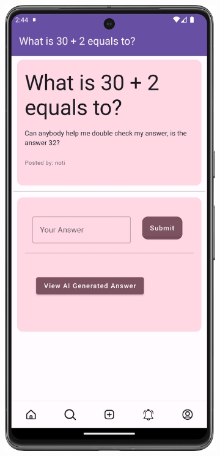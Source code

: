 \begin{figure}[H]
  \begin{subfigure}[b]{0.5\textwidth}
    \includegraphics[width=\textwidth]{Figures/Product_Images/Questions_Answers/add_answer.png}

\end{subfigure}
\end{figure}
